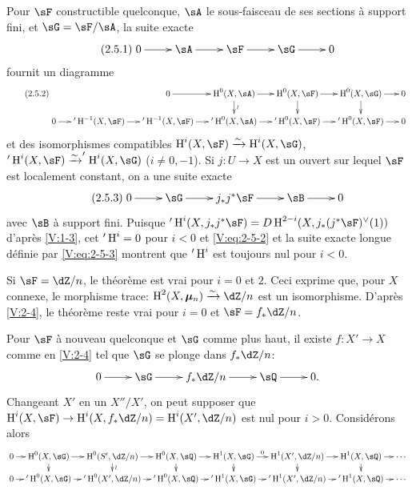 Pour $\sF$ constructible quelconque, $\sA$ le sous-faisceau de ses sections à 
support fini, et $\sG=\sF/\sA$, la suite exacte 
\begin{equation*}\label{V:eq:2-5-1}\tag{2.5.1}
\xymatrix{
  0 \ar[r] 
    & \sA \ar[r] 
    & \sF \ar[r] 
    & \sG \ar[r] 
    & 0 
}
\end{equation*}
fournit un diagramme 
\begin{equation*}\tag{2.5.2}\label{V:eq:2-5-2}
\xymatrix@=.5cm{
  & & 0 \ar[r] 
    & \h^0(X,\sA) \ar[r] \ar[d]^-\wr 
    & \h^0(X,\sF) \ar[r] \ar[d] 
    & \h^0(X,\sG) \ar[r] \ar[d] 
    & 0 \\
  0 \ar[r] 
  & '\h^{-1}(X,\sF) \ar[r] 
  & '\h^{-1}(X,\sF) \ar[r] 
  & '\h^0(X,\sA) \ar[r] 
  & '\h^0(X,\sF) \ar[r] 
  & '\h^0(X,\sF) \ar[r] 
  & 0 
}
\end{equation*}
et des isomorphismes compatibles $\h^i(X,\sF)\iso \h^i(X,\sG)$, 
$'\h^i(X,\sF) \iso '\h^i(X,\sG)$ ($i\ne 0,-1$). Si $j:U\to X$ est un ouvert sur 
lequel $\sF$ est localement constant, on a une suite exacte 
\begin{equation*}\tag{2.5.3}\label{V:eq:2-5-3}
\xymatrix{
  0 \ar[r] 
    & \sG \ar[r] 
    & j_\ast j^\ast \sF \ar[r] 
    & \sB \ar[r] 
    & 0
}
\end{equation*}
avec $\sB$ à support fini. Puisque 
$'\h^i(X,j_\ast j^\ast\sF) = D \h^{2-i} (X,j_\ast(j^\ast\sF)^\vee(1))$ 
d'après \ref{V:1-3}, cet $'\operatorname{H}^i=0$ pour $i<0$ et \eqref{V:eq:2-5-2} et la 
suite exacte longue définie par \eqref{V:eq:2-5-3} montrent que $'\operatorname{H}^i$ est 
toujours nul pour $i<0$. 

Si $\sF=\dZ/n$, le théorème est vrai pour $i=0$ et $2$. Ceci exprime que, 
pour $X$ connexe, le morphisme trace: $\h^2(X,\dmu_n) \iso \dZ/n$ est un 
isomorphisme. D'après \ref{V:2-4}, le théorème reste vrai pour $i=0$ et 
$\sF=f_\ast\dZ/n$. 

Pour $\sF$ à nouveau quelconque et $\sG$ comme plus haut, il existe 
$f:X'\to X$ comme en \ref{V:2-4} tel que $\sG$ se plonge dans $f_\ast\dZ/n$:
\[\xymatrix{
  0 \ar[r] 
    & \sG \ar[r] 
    & f_\ast\dZ/n \ar[r] 
    & \sQ \ar[r] 
    & 0 \text{.}
}\]
Changeant $X'$ en un $X''/X'$, on peut supposer que 
$\h^i(X,\sF) \to \h^i(X,f_\ast\dZ/n) = \h^i(X',\dZ/n)$ est nul pour $i>0$. 
Considérons alors 
\small
\[\xymatrix@=.3cm{
  0 \ar[r] 
    & \h^0(X,\sG) \ar[r] \ar[d] 
    & \h^0(S',\dZ/n) \ar[r] \ar[d]^-\wr 
    & \h^0(X,\sQ) \ar[r] \ar[d] 
    & \h^1(X,\sG) \ar[r]^-0 \ar[d] 
    & \h^1(X',\dZ/n) \ar[r] \ar[d] 
    & \h^1(X,\sQ) \ar[r] \ar[d] 
    & \cdots \\
  0 \ar[r] 
    & '\h^0(X,\sG) \ar[r] 
    & '\h^0(X',\dZ/n) \ar[r] 
    & '\h^0(X,\sQ) \ar[r] 
    & '\h^1(X,\sG) \ar[r] 
    & '\h^1(X',\dZ/n) \ar[r] 
    & '\h^1(X,\sQ) \ar[r] 
    & \cdots
}\]
\normalsize


